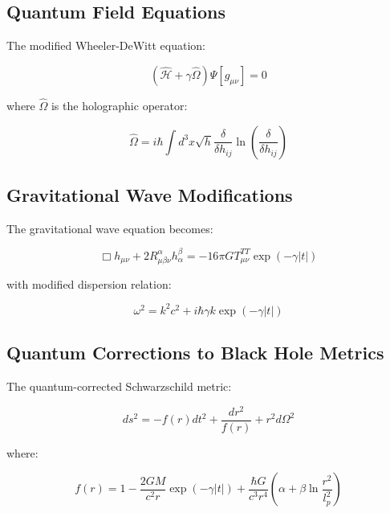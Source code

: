 \documentclass[12pt]{article}
\theoremstyle{plain}
\theoremstyle{definition}
\theoremstyle{remark}
\begin{document}
\subsection{Quantum Field Equations}

The modified Wheeler-DeWitt equation:

\begin{equation}
\left(\hat{\mathcal{H}} + \gamma\hat{\Omega}\right)\Psi[g_{\mu\nu}] = 0
\end{equation}

where $\hat{\Omega}$ is the holographic operator:

\begin{equation}
\hat{\Omega} = i\hbar\int d^3x \sqrt{h} \frac{\delta}{\delta h_{ij}}\ln\left(\frac{\delta}{\delta h_{ij}}\right)
\end{equation}

\subsection{Gravitational Wave Modifications}

The gravitational wave equation becomes:

\begin{equation}
\Box h_{\mu\nu} + 2R^{\alpha}_{\mu\beta\nu}h^{\beta}_{\alpha} = -16\pi G T_{\mu\nu}^{TT}\exp(-\gamma|t|)
\end{equation}

with modified dispersion relation:

\begin{equation}
\omega^2 = k^2c^2 + i\hbar\gamma k\exp(-\gamma|t|)
\end{equation}

\subsection{Quantum Corrections to Black Hole Metrics}

The quantum-corrected Schwarzschild metric:

\begin{equation}
ds^2 = -f(r)dt^2 + \frac{dr^2}{f(r)} + r^2d\Omega^2
\end{equation}

where:

\begin{equation}
f(r) = 1 - \frac{2GM}{c^2r}\exp(-\gamma|t|) + \frac{\hbar G}{c^3r^4}\left(\alpha + \beta\ln\frac{r^2}{l_p^2}\right)
\end{equation}
\end{document}
